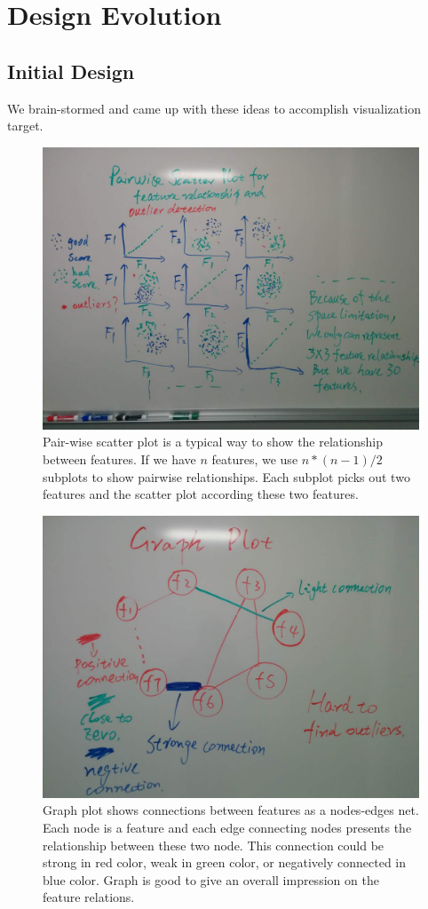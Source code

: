 \documentclass{article}
\begin{document}
\section{Design Evolution}
\subsection{Initial Design}
We brain-stormed and came up with these ideas to accomplish visualization target.
\begin{figure}[H]
\centering
\includegraphics[scale=0.23]{pairwise_scatter.jpg}
\caption{Pair-wise scatter plot is a typical way to show the relationship between features. If we have $n$ features, we use $n*(n-1)/2$ subplots to show pairwise relationships. Each subplot picks out two features and the scatter plot according these two features.}
\end{figure}

\begin{figure}[H]
\centering
\includegraphics[scale=0.23]{graph.jpg}
\caption{Graph plot shows connections between features as a nodes-edges net. Each node is a feature and each edge connecting nodes presents the relationship between these two node. This connection could be strong in red color, weak in green color, or negatively connected in blue color. Graph is good to give an overall impression on the feature relations.}
\end{figure}
\end{document}
